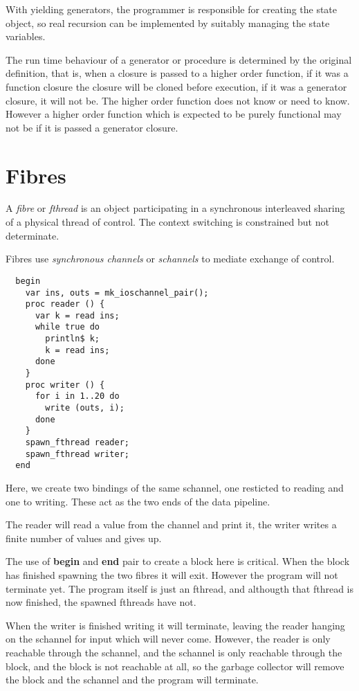 \documentclass{article}
\begin{document}
With yielding generators, the programmer is responsible for
creating the state object, so real recursion can be implemented
by suitably managing the state variables.

The run time behaviour of a generator or procedure is determined
by the original definition, that is, when a closure is passed
to a higher order function, if it was a function closure the
closure will be cloned before execution, if it was a generator
closure, it will not be. The higher order function does not
know or need to know. However a higher order function which is
expected to be purely functional may not be if it is passed
a generator closure.

\section{Fibres}
A {\em fibre} or {\em fthread} is an object participating in a synchronous
interleaved sharing of a physical thread of control. The context switching
is constrained but not determinate. 

Fibres use {\em synchronous channels} or {\em schannels} to mediate
exchange of control.

\begin{verbatim}
  begin
    var ins, outs = mk_ioschannel_pair();
    proc reader () {
      var k = read ins;
      while true do
        println$ k;
        k = read ins;
      done
    }
    proc writer () {
      for i in 1..20 do
        write (outs, i);
      done
    }
    spawn_fthread reader;
    spawn_fthread writer;
  end
\end{verbatim}
Here, we create two bindings of the same schannel, one resticted to
reading and one to writing. These act as the two ends of the data 
pipeline.

The reader will read a value from the channel and print it,
the writer writes a finite number of values and gives up.

The use of {\bf begin} and {\bf end} pair to create a block here
is critical. When the block has finished spawning the two fibres
it will exit. However the program will not terminate yet.
The program itself is just an fthread, and althougth that fthread
is now finished, the spawned fthreads have not.

When the writer is finished writing it will terminate, leaving
the reader hanging on the schannel for input which will never
come. However, the reader is only reachable through the schannel,
and the schannel is only reachable through the block, and the 
block is not reachable at all, so the garbage collector will
remove the block and the schannel and the program will terminate.
\end{document}
